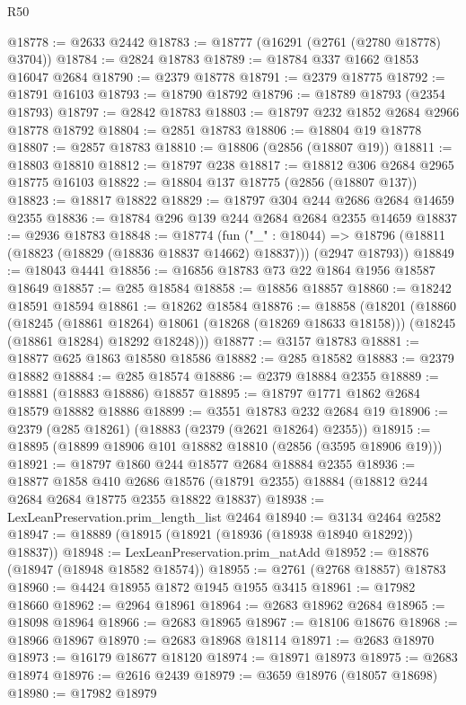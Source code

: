 \begin{lexlean}{R50}
\begin{coremodule}
@18778 := @2633 @2442
@18783 := @18777 (@16291 (@2761 (@2780 @18778) @3704))
@18784 := @2824 @18783
@18789 := @18784 @337 @1662 @1853 @16047 @2684
@18790 := @2379 @18778
@18791 := @2379 @18775
@18792 := @18791 @16103
@18793 := @18790 @18792
@18796 := @18789 @18793 (@2354 @18793)
@18797 := @2842 @18783
@18803 := @18797 @232 @1852 @2684 @2966 @18778 @18792
@18804 := @2851 @18783
@18806 := @18804 @19 @18778
@18807 := @2857 @18783
@18810 := @18806 (@2856 (@18807 @19))
@18811 := @18803 @18810
@18812 := @18797 @238
@18817 := @18812 @306 @2684 @2965 @18775 @16103
@18822 := @18804 @137 @18775 (@2856 (@18807 @137))
@18823 := @18817 @18822
@18829 := @18797 @304 @244 @2686 @2684 @14659 @2355
@18836 := @18784 @296 @139 @244 @2684 @2684 @2355 @14659
@18837 := @2936 @18783
@18848 := @18774
    (fun ("_" : @18044) =>
    @18796 (@18811 (@18823 (@18829 (@18836 @18837 @14662) @18837))) (@2947 @18793))
@18849 := @18043 @4441
@18856 := @16856 @18783 @73 @22 @1864 @1956 @18587 @18649
@18857 := @285 @18584
@18858 := @18856 @18857
@18860 := @18242 @18591 @18594
@18861 := @18262 @18584
@18876 := @18858
    (@18201
      (@18860
        (@18245 (@18861 @18264) @18061 (@18268 (@18269 @18633 @18158)))
        (@18245 (@18861 @18284) @18292 @18248)))
@18877 := @3157 @18783
@18881 := @18877 @625 @1863 @18580 @18586
@18882 := @285 @18582
@18883 := @2379 @18882
@18884 := @285 @18574
@18886 := @2379 @18884 @2355
@18889 := @18881 (@18883 @18886) @18857
@18895 := @18797 @1771 @1862 @2684 @18579 @18882 @18886
@18899 := @3551 @18783 @232 @2684 @19
@18906 := @2379 (@285 @18261) (@18883 (@2379 (@2621 @18264) @2355))
@18915 := @18895 (@18899 @18906 @101 @18882 @18810 (@2856 (@3595 @18906 @19)))
@18921 := @18797 @1860 @244 @18577 @2684 @18884 @2355
@18936 := @18877
    @1858
    @410
    @2686
    @18576
    (@18791 @2355)
    @18884
    (@18812 @244 @2684 @2684 @18775 @2355 @18822 @18837)
@18938 := LexLeanPreservation.prim_length_list @2464
@18940 := @3134 @2464 @2582
@18947 := @18889 (@18915 (@18921 (@18936 (@18938 @18940 @18292)) @18837))
@18948 := LexLeanPreservation.prim_natAdd
@18952 := @18876 (@18947 (@18948 @18582 @18574))
@18955 := @2761 (@2768 @18857) @18783
@18960 := @4424 @18955 @1872 @1945 @1955 @3415
@18961 := @17982 @18660
@18962 := @2964 @18961
@18964 := @2683 @18962 @2684
@18965 := @18098 @18964
@18966 := @2683 @18965
@18967 := @18106 @18676
@18968 := @18966 @18967
@18970 := @2683 @18968 @18114
@18971 := @2683 @18970
@18973 := @16179 @18677 @18120
@18974 := @18971 @18973
@18975 := @2683 @18974
@18976 := @2616 @2439
@18979 := @3659 @18976 (@18057 @18698)
@18980 := @17982 @18979

\end{coremodule}
\end{lexlean}

